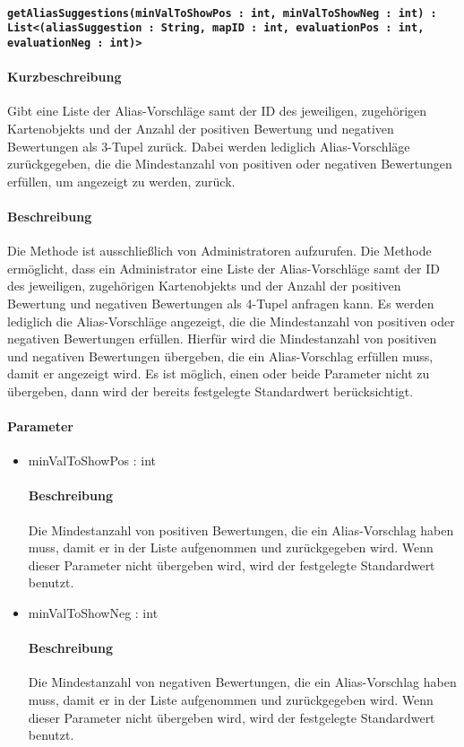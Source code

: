 \paragraph{\texttt{getAliasSuggestions(minValToShowPos : int, minValToShowNeg : int) : List<(aliasSuggestion : String, mapID : int, evaluationPos : int, evaluationNeg : int)>}}%
\paragraph*{Kurzbeschreibung}
Gibt eine Liste der Alias-Vorschläge samt der ID des jeweiligen, zugehörigen Kartenobjekts und der Anzahl der positiven Bewertung und negativen Bewertungen als 3-Tupel zurück. Dabei werden lediglich Alias-Vorschläge zurückgegeben, die die Mindestanzahl von positiven oder negativen Bewertungen erfüllen, um angezeigt zu werden, zurück.
\paragraph*{Beschreibung}
Die Methode ist ausschließlich von Administratoren aufzurufen.
Die Methode ermöglicht, dass ein Administrator eine Liste der Alias-Vorschläge samt der ID des jeweiligen, zugehörigen Kartenobjekts und der Anzahl der positiven Bewertung und negativen Bewertungen als 4-Tupel anfragen kann. 
Es werden lediglich die Alias-Vorschläge angezeigt, die die Mindestanzahl von positiven oder negativen Bewertungen erfüllen.
Hierfür wird die Mindestanzahl von positiven und negativen Bewertungen übergeben, die ein Alias-Vorschlag erfüllen muss, damit er angezeigt wird.
Es ist möglich, einen oder beide Parameter nicht zu übergeben, dann wird der bereits festgelegte Standardwert berücksichtigt.
\paragraph*{Parameter}
\begin{itemize}
	\item minValToShowPos : int
		\paragraph*{Beschreibung}
		Die Mindestanzahl von positiven Bewertungen, die ein Alias-Vorschlag haben muss, damit er in der Liste aufgenommen und zurückgegeben wird.
		Wenn dieser Parameter nicht übergeben wird, wird der festgelegte Standardwert benutzt.
	\item minValToShowNeg : int
		\paragraph*{Beschreibung}
		Die Mindestanzahl von negativen Bewertungen, die ein Alias-Vorschlag haben muss, damit er in der Liste aufgenommen und zurückgegeben wird. 
		Wenn dieser Parameter nicht übergeben wird, wird der festgelegte Standardwert benutzt.
\end{itemize}
